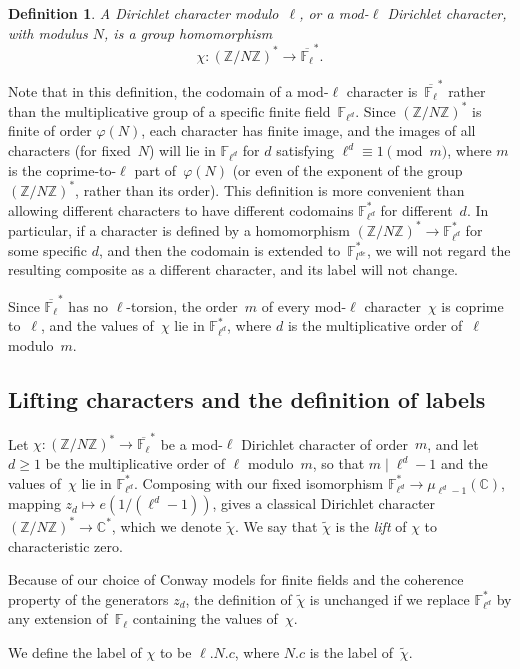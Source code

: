 \documentclass[a4paper, 10pt]{amsart}
\newtheorem{defn}{Definition}%
\def\Z{{\mathbb Z}}
\def\C{{\mathbb C}}
\def\F{{\mathbb F}}
\def\Fl{{\mathbb F}_{\ell}}
\def\Fld{{\mathbb F}_{\ell^d}}
\def\Flbar{\overline{{\mathbb F}_{\ell}}}
\def\ZNs{(\Z/N\Z)^*}
\newcommand{\CLab}[2]{$#1.#2$}
\newcommand{\DLab}[3]{$#1.#2.#3$}
\begin{document}
\begin{defn} A \emph{Dirichlet character modulo~$\ell$}, or a
  \emph{mod-$\ell$ Dirichlet character}, with modulus $N$, is a group
  homomorphism
  \[
  \chi:  \ZNs \to \Flbar^*.
  \]
\end{defn}
Note that in this definition, the codomain of a mod-$\ell$ character
is~$\Flbar^*$ rather than the multiplicative group of a specific
finite field~$\Fld$.  Since $\ZNs$ is finite of order $\varphi(N)$,
each character has finite image, and the images of all characters (for
fixed~$N$) will lie in $\Fld$ for $d$ satisfying
$\ell^d\equiv1\pmod{m}$, where $m$ is the coprime-to-$\ell$ part
of~$\varphi(N)$ (or even of the exponent of the group~$\ZNs$, rather
than its order).  This definition is more convenient than allowing
different characters to have different codomains $\Fld^*$ for
different~$d$.  In particular, if a character is defined by a
homomorphism $\ZNs\to\Fld^*$ for some specific $d$, and then the
codomain is extended to~$\F_{l^{de}}^*$, we will not regard the
resulting composite as a different character, and its label will not
change.

Since $\Flbar^*$ has no $\ell$-torsion, the order~$m$ of every
mod-$\ell$ character~$\chi$ is coprime to~$\ell$, and the values
of~$\chi$ lie in $\Fld^*$, where $d$ is the multiplicative order
of~$\ell$ modulo~$m$.

\subsection{Lifting characters and the definition of labels}

Let $\chi: \ZNs \to \Flbar^*$ be a mod-$\ell$ Dirichlet character
of order~$m$, and let $d\ge1$ be the multiplicative order of $\ell$
modulo~$m$, so that $m\mid\ell^d-1$ and the values of~$\chi$ lie in
$\Fld^*$.  Composing with our fixed isomorphism $\Fld^* \to
\mu_{\ell^d-1}(\C)$, mapping $z_d\mapsto e(1/(\ell^d-1))$, gives a
classical Dirichlet character $\ZNs\to\C^*$, which we denote
$\tilde{\chi}$.  We say that $\tilde{\chi}$ is the \emph{lift} of
$\chi$ to characteristic zero.

Because of our choice of Conway models for finite fields and the
coherence property of the generators $z_d$, the definition of
$\tilde{\chi}$ is unchanged if we replace $\Fld^*$ by any extension
of~$\Fl$ containing the values of~$\chi$.

We define the label of $\chi$ to be \DLab{\ell}{N}{c}, where
\CLab{N}{c} is the label of~$\tilde{\chi}$.
\end{document}
